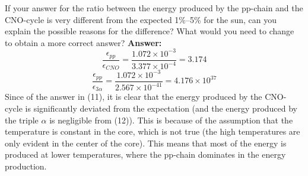 \documentclass[11pt]{scrartcl}
\begin{document}
{\begin{enumerate}[label=(\alph*)]
If your answer for the ratio between the energy produced by the pp-chain and the CNO-cycle is very different from
the expected 1\%–5\% for the sun, can you explain the possible reasons for the difference? What would you need
to change to obtain a more correct answer?
\newline \textbf{Answer: }
\begin{equation}
    \frac{\epsilon_{pp}}{\epsilon_{CNO}} =\frac{1.072 \times 10^{-3}}{3.377 \times 10^{-4}} = 3.174
\end{equation}
\begin{equation}
    \frac{\epsilon_{pp}}{\epsilon_{3\alpha}} =\frac{1.072 \times 10^{-3}}{2.567 \times 10^{-41}} = 4.176 \times 10^{37}
\end{equation}
Since of the answer in (11), it is clear that the energy produced by the CNO-cycle is significantly deviated from the expectation (and the energy produced by the triple $\alpha$ is negligible from (12)). This is because of the assumption that the temperature is constant in the core, which is not true (the high temperatures are only evident in the
center of the core). This means that most of the energy is produced at lower
temperatures, where the pp-chain dominates in the energy production.


\end{enumerate}}
\end{document}
